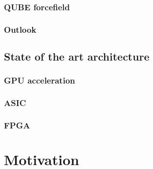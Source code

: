 \subsubsection{QUBE forcefield}

\subsubsection{Outlook}

\subsection{State of the art architecture}

\subsubsection{GPU acceleration}

\subsubsection{ASIC}

\subsubsection{FPGA}

\section{Motivation}
